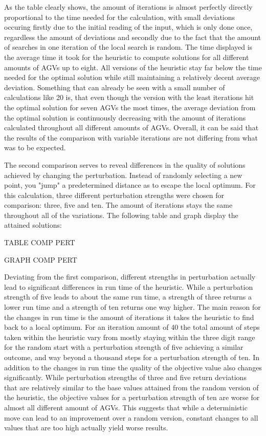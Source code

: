 As the table clearly shows, the amount of iterations is almost perfectly directly proportional to the time needed for the calculation, with small deviations occuring firstly due to the initial reading of the input, which is only done once, regardless the amount of deviations and secondly due to the fact that the amount of searches in one iteration of the local search is random. The time displayed is the average time it took for the heuristic to compute solutions for all different amounts of AGVs up to eight. All versions of the heuristic stay far below the time needed for the optimal solution while still maintaining a relatively decent average deviation. Something that can already be seen with a small number of calculations like 20 is, that even though the version with the least iterations hit the optimal solution for seven AGVs the most times, the average deviation from the optimal solution is continuously decreasing with the amount of iterations calculated throughout all different amounts of AGVs. Overall, it can be said that the results of the comparison with variable iterations are not differing from what was to be expected.

The second comparison serves to reveal differences in the quality of solutions achieved by changing the perturbation. Instead of randomly selecting a new point, you "jump" a predetermined distance as to escape the local optimum. For this calculation, three different perturbation strengths were chosen for comparison: three, five and ten. The amount of iterations stays the same throughout all of the variations. The following table and graph display the attained solutions:

TABLE COMP PERT

GRAPH COMP PERT

Deviating from the first comparison, different strengths in perturbation actually lead to significant differences in run time of the heuristic. While a perturbation strength of five leads to about the same run time, a strength of three returns a lower run time and a strength of ten returns one way higher. The main reason for the changes in run time is the amount of iterations it takes the heuristic to find back to a local optimum. For an iteration amount of 40 the total amount of steps taken within the heuristic vary from mostly staying within the three digit range for the random start with a perturbation strength of five achieving a similar outcome, and way beyond a thousand steps for a perturbation strength of ten. In addition to the changes in run time the quality of the objective value also changes significantly. While perturbation strengths of three and five return deviations that are relatively similar to the base values attained from the random version of the heuristic, the objective values for a perturbation strength of ten are worse for almost all different amount of AGVs. This suggests that while a deterministic move can lead to an improvement over a random version, constant changes to all values that are too high actually yield worse results.